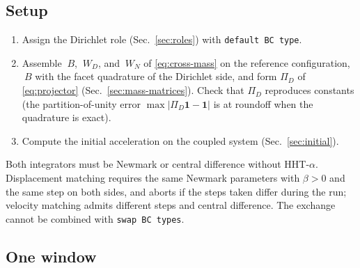 \documentclass[11pt]{article}
\newcommand{\code}[1]{\texttt{#1}}
\begin{document}
\subsection{Setup}
\label{sec:matching-setup}

\begin{enumerate}[itemsep=2pt]
\item Assign the Dirichlet role (Sec.~\ref{sec:roles}) with
  \code{default BC type}.
\item Assemble $~B$, $~W_D$, and $~W_N$ of \eqref{eq:cross-mass} on the
  reference configuration, $~B$ with the facet quadrature of the Dirichlet
  side, and form $\Pi_D$ of \eqref{eq:projector}
  (Sec.~\ref{sec:mass-matrices}). Check that $\Pi_D$ reproduces constants
  (the partition-of-unity error $\max |\Pi_D \mathbf{1} - \mathbf{1}|$ is at
  roundoff when the quadrature is exact).
\item Compute the initial acceleration on the coupled system
  (Sec.~\ref{sec:initial}).
\end{enumerate}
Both integrators must be Newmark or central difference without
HHT-$\alpha$. Displacement matching requires the same
Newmark parameters with $\beta > 0$ and the same step on both sides, and
aborts if the steps taken differ during the run; velocity matching admits
different steps and central difference. The exchange cannot be combined
with \code{swap BC types}.

\subsection{One window}
\label{sec:window}
\end{document}
